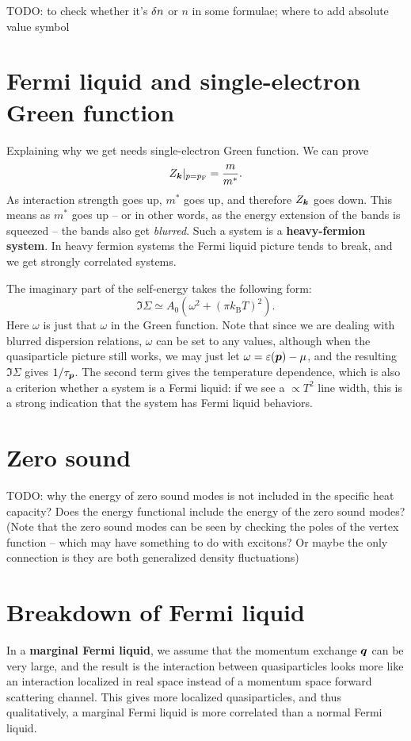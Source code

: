 \documentclass[hyperref, a4paper]{article}
\newcommand*{\concept}[1]{{\textbf{#1}}}
\newcommand*{\kB}{k_{\text{B}}}
\newcommand*{\pfermi}{p_{\text{F}}}
\begin{document}
TODO: to check whether it's $\var{n}$ or $n$ in some formulae; 
where to add absolute value symbol

\section{Fermi liquid and single-electron Green function}

Explaining why we get  
needs single-electron Green function.
We can prove 
\begin{equation}
    Z_{\vb*{k}}|_{p = \pfermi} = \frac{m}{m^*}.
\end{equation}
As interaction strength goes up, $m^*$ goes up, 
and therefore $Z_{\vb*{k}}$ goes down.
This means as $m^*$ goes up -- or in other words, 
as the energy extension of the bands is squeezed -- 
the bands also get \emph{blurred}.
Such a system is a \concept{heavy-fermion system}.
In heavy fermion systems the Fermi liquid picture tends to break,
and we get strongly correlated systems.

The imaginary part of the self-energy takes the following form: 
\begin{equation}
    \Im \Sigma \simeq A_0 (\omega^2 + (\pi \kB T)^2).
\end{equation}
Here $\omega$ is just that $\omega$ in the Green function.
Note that since we are dealing with blurred dispersion relations, 
$\omega$ can be set to any values, 
although when the quasiparticle picture still works, 
we may just let $\omega = \varepsilon(\vb*{p}) - \mu$, 
and the resulting $\Im \Sigma$ gives $1 / {\tau_{\vb*{p}}}$.
The second term gives the temperature dependence,
which is also a criterion whether a system is a Fermi liquid: 
if we see a $\propto T^2$ line width,
this is a strong indication that the system 
has Fermi liquid behaviors.

\section{Zero sound}

TODO: why the energy of zero sound modes is not included in the specific heat capacity?
Does the energy functional include the energy of the zero sound modes?
(Note that the zero sound modes can be seen by checking the poles of the vertex function 
-- which may have something to do with excitons? 
Or maybe the only connection is they are both generalized density fluctuations)

\section{Breakdown of Fermi liquid}

In a \concept{marginal Fermi liquid}, 
we assume that the momentum exchange $\vb*{q}$ can be very large, 
and the result is the interaction between quasiparticles 
looks more like an interaction localized in real space 
instead of a momentum space forward scattering channel.
This gives more localized quasiparticles,
and thus qualitatively, 
a marginal Fermi liquid is more correlated than 
a normal Fermi liquid.
\end{document}
